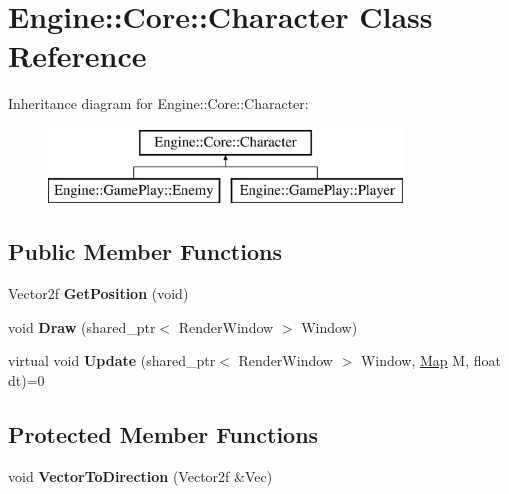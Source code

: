 \hypertarget{class_engine_1_1_core_1_1_character}{}\section{Engine\+:\+:Core\+:\+:Character Class Reference}
\label{class_engine_1_1_core_1_1_character}
Inheritance diagram for Engine\+:\+:Core\+:\+:Character\+:\begin{figure}[H]
\begin{center}
\leavevmode
\includegraphics[height=2.000000cm]{class_engine_1_1_core_1_1_character}
\end{center}
\end{figure}
\subsection*{Public Member Functions}
\begin{DoxyCompactItemize}
\item 
\mbox{\label{class_engine_1_1_core_1_1_character_aea290308ddc56ab784c87f85e6b7f254}} 
Vector2f {\bfseries Get\+Position} (void)
\item 
\mbox{\label{class_engine_1_1_core_1_1_character_ae009c4273cb264195b09c9213be091bf}} 
void {\bfseries Draw} (shared\+\_\+ptr$<$ Render\+Window $>$ Window)
\item 
\mbox{\label{class_engine_1_1_core_1_1_character_a3942a81285869375d899ae2d703e7f0b}} 
virtual void {\bfseries Update} (shared\+\_\+ptr$<$ Render\+Window $>$ Window, \hyperlink{class_engine_1_1_core_1_1_map}{Map} M, float dt)=0
\end{DoxyCompactItemize}
\subsection*{Protected Member Functions}
\begin{DoxyCompactItemize}
\item 
\mbox{\label{class_engine_1_1_core_1_1_character_a16677d58863fb7ca126b8fd87c4201ba}} 
void {\bfseries Vector\+To\+Direction} (Vector2f \&Vec)
\end{DoxyCompactItemize}
